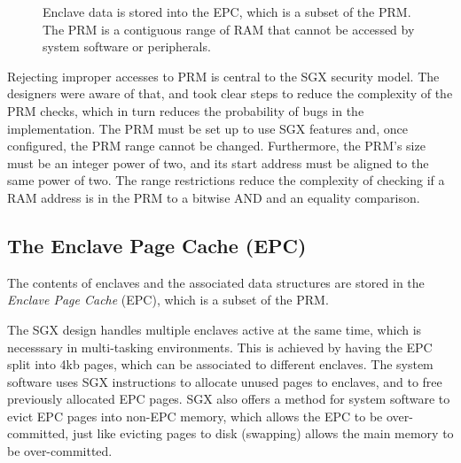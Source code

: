 \begin{figure}[hbt]
  \caption{
    Enclave data is stored into the EPC, which is a subset of the PRM. The
    PRM is a contiguous range of RAM that cannot be accessed by system software
    or peripherals.
  }
  \label{fig:sgx_epc}
\end{figure}

Rejecting improper accesses to PRM is central to the SGX security model. The
designers were aware of that, and took clear steps to reduce the complexity of
the PRM checks, which in turn reduces the probability of bugs in the
implementation. The PRM must be set up to use SGX features and, once
configured, the PRM range cannot be changed. Furthermore, the PRM's size must
be an integer power of two, and its start address must be aligned to the same
power of two. The range restrictions reduce the complexity of checking if a RAM
address is in the PRM to a bitwise AND and an equality comparison.


\subsection{The Enclave Page Cache (EPC)}
\label{sec:epc}


The contents of enclaves and the associated data structures are stored in the
\textit{Enclave Page Cache} (EPC), which is a subset of the PRM.

The SGX design handles multiple enclaves active at the same time, which is
necesssary in multi-tasking environments. This is achieved by having the EPC
split into 4kb pages, which can be associated to different enclaves. The system
software uses SGX instructions to allocate unused pages to enclaves, and to
free previously allocated EPC pages. SGX also offers a method for system
software to evict EPC pages into non-EPC memory, which allows the EPC to be
over-committed, just like evicting pages to disk (swapping) allows the main
memory to be over-committed.


